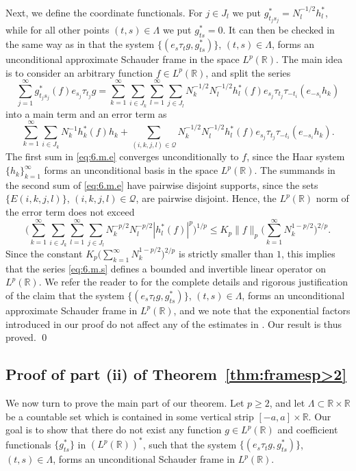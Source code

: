 \documentclass[reqno,a4paper,12pt]{amsart}
\numberwithin{equation}{section}
\numberwithin{figure}{section}
\newcommand\R{\mathbb{R}}
\newcommand\Lam{\Lambda}
\newcommand\1{\mathds{1}}
\newcommand{\ts}{\tau}
\renewcommand\le{\leqslant}
\renewcommand\ge{\geqslant}
\newcommand\sbt{\subset}
\theoremstyle{plain}
\newcommand{\thmref}[1]{Theorem~\ref{#1}}
\theoremstyle{definition}
\begin{document}
Next, we define the coordinate functionals. 
For $j \in J_l$ we put $g^*_{t_j s_j} = N_l^{-1/2} h_l^*$,
while for all other points $(t,s)\in\Lambda$ we put $g^*_{ts} = 0$.
It can then be checked in the same way as in \cite[Theorem 3.2]{FOSZ14} that 
the system $\{(e_s \ts_t g, g^*_{ts})\}$, $(t,s)\in\Lambda$, forms
an unconditional approximate Schauder frame in the space $L^p(\R)$.
The main idea is to 
consider an arbitrary function $f \in L^p(\R)$, and split the series
\begin{equation}
\label{eq:6.m.s}
\sum_{j=1}^\infty g^*_{t_j s_j}(f) e_{s_j} \ts_{t_j} g 
= \sum_{k=1}^\infty \sum_{i \in J_k} 
 \sum_{l=1}^\infty \sum_{j \in J_l} 
 N_k^{-1/2}  N_l^{-1/2} h^*_l(f) e_{s_j} \ts_{t_j}  \ts_{-t_i} (e_{-s_i} h_k)
\end{equation}
into a main term and an error term as
\begin{equation}
\label{eq:6.m.e}
 \sum_{k=1}^\infty \sum_{i \in J_k} N_k^{-1} h^*_k(f) h_k
+ \sum_{(i,k,j,l)  \in \mathcal{Q}} N_k^{-1/2} N_l^{-1/2}   h^*_l(f) e_{s_j} \ts_{t_j}  \ts_{-t_i} (e_{-s_i} h_k).
\end{equation}
The first sum in \eqref{eq:6.m.e} converges unconditionally to $f$, since  the Haar system
$\{h_k\}_{k=1}^\infty$ forms an unconditional basis in the space $L^p(\R)$.
The summands in the second sum of
\eqref{eq:6.m.e} have pairwise disjoint supports, 
since the sets $\{E(i,k,j,l) \}$, $ (i,k,j,l) \in \mathcal{Q}$,
are pairwise disjoint. Hence,
the $L^p(\R)$ norm of the error term does not exceed
\begin{equation}
\label{eq:6.r.p}
\Big( \sum_{k=1}^\infty \sum_{i \in J_k} 
 \sum_{l=1}^\infty \sum_{j \in J_l} 
 N_k^{-p/2}  N_l^{-p/2} |h^*_l(f)|^p \Big)^{1/p} 
 \le  K_p  \|f\|_p \Big( \sum_{k=1}^\infty N_k^{1-p/2} \Big)^{2/p}.
\end{equation}
Since the constant
$ K_p \big( \sum_{k=1}^\infty N_k^{1-p/2} \big)^{2/p}$
is strictly smaller than $1$, this implies that
the series \eqref{eq:6.m.s} defines a bounded and 
invertible linear operator on $L^p(\R)$.
We refer the reader to \cite[Theorem 3.2]{FOSZ14} for the
complete details and rigorous justification of the claim
that the system $\{(e_s \ts_t g, g^*_{ts})\}$, $(t,s)\in\Lambda$, forms
an unconditional approximate Schauder frame in  $L^p(\R)$,
and we note that the exponential factors introduced in our
proof  do not affect any  of the estimates in \cite{FOSZ14}.
Our result is thus proved.
\qed



\subsection{Proof of part (ii) of \thmref{thm:framesp>2}}
We now turn to prove the main part of our theorem.
Let $p \ge 2$, and let $\Lam \sbt \R \times \R$ be a countable set which is
contained in some vertical strip $[-a, a]\times\R$.
Our goal is to show that there do not exist
any function $g\in L^p(\R)$ and 
coefficient functionals $\{ g^*_{ts} \}$ in $(L^p(\R))^*$,
such that the system $\{(e_s \tau_t g, g^*_{ts})\}$, $(t,s) \in \Lam$, 
forms an unconditional Schauder frame in  $L^p(\R)$.
\end{document}
